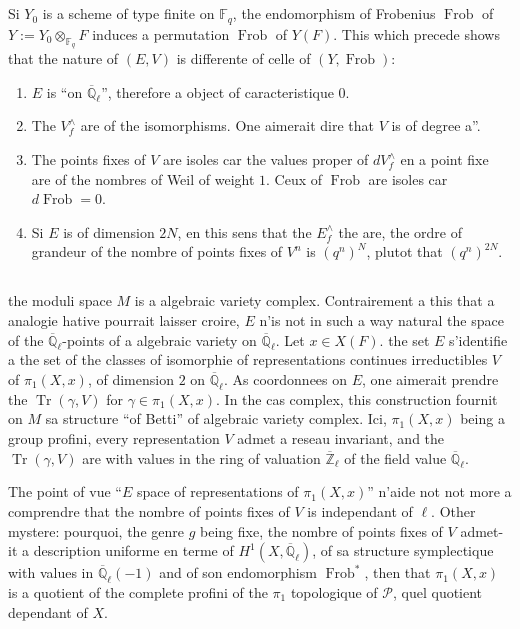 \documentclass[11pt,a4paper]{article}
\theoremstyle{plain}
\theoremstyle{definition}
\DeclareMathOperator{\Frob}{Frob}
\DeclareMathOperator{\Tr}{Tr}
\newcommand{\F}{\mathbb{F}}
\newcommand{\Ql}{\overline{\mathbb{Q}}_\ell}
\newcommand{\Zl}{\overline{\mathbb{Z}}_\ell}
\begin{document}
\subsection{}
Si $Y_0$ is a scheme of type finite on $\F_q$, the endomorphism of Frobenius $\Frob$ of $Y := Y_0 \otimes_{\F_q} F$ induces a permutation $\Frob$ of $Y(F)$. This which precede shows that the nature of $(E,V)$ is differente of celle of $(Y, \Frob)$:

\begin{enumerate}[label=(\roman*)]
\item $E$ is ``on $\Ql$'', therefore a object of caracteristique $0$.
\item The $V^\wedge_f$ are of the isomorphisms. One aimerait dire that $V$ is of degree a''.
\item The points fixes of $V$ are isoles car the values proper of $dV^\wedge_f$ en a point fixe are of the nombres of Weil of weight $1$. Ceux of $\Frob$ are isoles car $d\Frob = 0$.
\item Si $E$ is of dimension $2N$, en this sens that the $E^\wedge_f$ the are, the ordre of grandeur of the nombre of points fixes of $V^n$ is $(q^n)^N$, plutot that $(q^n)^{2N}$.
\end{enumerate}

\subsection{}
the moduli space $M$ is a algebraic variety complex. Contrairement a this that a analogie hative pourrait laisser croire, $E$ n'is not in such a way natural the space of the $\Ql$-points of a algebraic variety on $\Ql$. Let $x \in X(F)$. the set $E$ s'identifie a the set of the classes of isomorphie of representations continues irreductibles $V$ of $\pi_1(X,x)$, of dimension $2$ on $\Ql$. As coordonnees on $E$, one aimerait prendre the $\Tr(\gamma, V)$ for $\gamma \in \pi_1(X,x)$. In the cas complex, this construction fournit on $M$ sa structure ``of Betti'' of algebraic variety complex. Ici, $\pi_1(X,x)$ being a group profini, every representation $V$ admet a reseau invariant, and the $\Tr(\gamma, V)$ are with values in the ring of valuation $\Zl$ of the field value $\Ql$.

The point of vue ``$E$ space of representations of $\pi_1(X,x)$'' n'aide not not more a comprendre that the nombre of points fixes of $V$ is independant of $\ell$. Other mystere: pourquoi, the genre $g$ being fixe, the nombre of points fixes of $V$ admet-it a description uniforme en terme of $H^1(X, \Ql)$, of sa structure symplectique with values in $\Ql(-1)$ and of son endomorphism $\Frob^*$, then that $\pi_1(X,x)$ is a quotient of the complete profini of the $\pi_1$ topologique of $\mathcal{P}$, quel quotient dependant of $X$.
\end{document}
